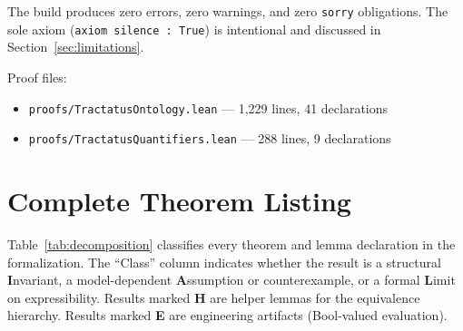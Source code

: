 \documentclass[10pt, letterpaper]{article}
\theoremstyle{definition}
\theoremstyle{remark}
\begin{document}
\noindent
The build produces zero errors, zero warnings, and zero
\texttt{sorry} obligations.  The sole axiom
(\texttt{axiom silence : True}) is intentional and
discussed in Section~\ref{sec:limitations}.

Proof files:
\begin{itemize}[nosep]
  \item \texttt{proofs/TractatusOntology.lean} --- 1,229 lines, 41 declarations
  \item \texttt{proofs/TractatusQuantifiers.lean} --- 288 lines, 9 declarations
\end{itemize}

\section{Complete Theorem Listing}
\label{app:theorems}

Table~\ref{tab:decomposition} classifies every theorem and lemma
declaration in the formalization.  The ``Class'' column indicates
whether the result is a structural \textbf{I}nvariant,
a model-dependent \textbf{A}ssumption or counterexample, or a
formal \textbf{L}imit on expressibility.  Results marked
\textbf{H} are helper lemmas for the equivalence hierarchy.
Results marked \textbf{E} are engineering artifacts
(Bool-valued evaluation).
\end{document}

